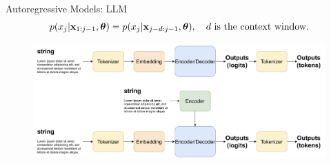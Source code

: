 \documentclass{beamer}
\begin{document}
\begin{frame}{Autoregressive Models: LLM}
	$$
		p(x_j | \mathbf{x}_{1:j - 1}, \boldsymbol{\theta}) = p(x_j | \mathbf{x}_{j - d:j - 1}, \boldsymbol{\theta}), \quad d \text{ is the context window}.
	$$
	 \begin{figure}
		   \centering
		   \includegraphics[width=1.0\linewidth]{figs/llm_modeling}
	 \end{figure}
\end{frame}
\end{document}

